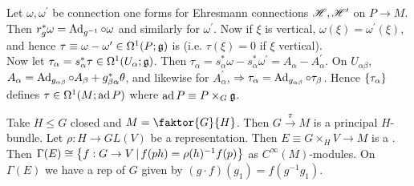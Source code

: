 \documentclass{article}
\begin{document}
\begin{example}
Let $\omega, \omega^\prime$ be connection one forms for Ehresmann connections $\mathscr{H}, \mathscr{H}^\prime$ on $P \to M$. Then $r_g^\ast \omega = \operatorname{Ad}_{g^{-1}} \circ \omega$ and similarly for $\omega^\prime$. Now if $\xi$ is vertical, $\omega(\xi) = \omega^\prime(\xi)$, and hence $\tau \equiv \omega - \omega^\prime \in \Omega^1(P;\mathfrak{g})$ is  (i.e. $\tau(\xi) = 0$ if $\xi$ vertical). \\
Now let $\tau_\alpha = s_\alpha^\ast \tau \in \Omega^1(U_\alpha;\mathfrak{g})$. Then $\tau_\alpha = s_\alpha^\ast \omega - s_\alpha^\ast \omega^\prime = A_\alpha - A_\alpha^\prime$. On $U_{\alpha\beta}$, $A_\alpha = \operatorname{Ad}_{g_{\alpha\beta}} \circ A_\beta + g_{\beta\alpha}^\ast \theta$, and likewise for $A_\alpha^\prime$, $\Rightarrow \tau_\alpha = \operatorname{Ad}_{g_{\alpha\beta}}\circ\tau_\beta$. Hence $\left\{ \tau_\alpha \right\}$ defines $\tau \in \Omega^1(M;\operatorname{ad} P)$ where $\operatorname{ad} P \equiv P \times_G \mathfrak{g}$. 
\end{example}

\begin{example}
Take $H \leq G$ closed and $M= \faktor{G}{H}$. Then $G\overset{\pi}{\to}M$ is a principal $H$-bundle. Let $\rho : H \to GL(V)$ be a representation. Then $E\equiv G \times_H V \to M$ is a . Then $\Gamma(E) \cong \left\{ f:G \to V \, | \, f(ph) = \rho(h)^{-1} f(p) \right\}$ as $C^\infty(M)$-modules. On $\Gamma(E)$ we have a rep of $G$ given by $(g \cdot f)(g_1) = f(g^{-1} g_1)$.
\end{example}
\end{document}
